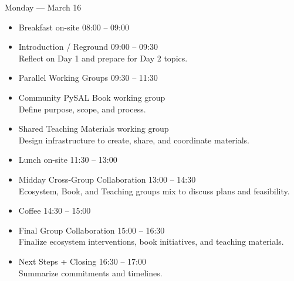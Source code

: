 \documentclass[11pt, aspectratio=169]{beamer}
\begin{document}
\begin{frame}{Monday — March 16}
  \large
  \begin{itemize}
    \item Breakfast on-site \hfill 08:00 -- 09:00
    \item Introduction / Reground \hfill 09:00 -- 09:30\\
      \quad Reflect on Day 1 and prepare for Day 2 topics.
    \item Parallel Working Groups \hfill 09:30 -- 11:30
    \item Community PySAL Book working group \\
      \quad Define purpose, scope, and process.
    \item Shared Teaching Materials working group \\
      \quad Design infrastructure to create, share, and coordinate materials.
    \item Lunch on-site \hfill 11:30 -- 13:00
    \item Midday Cross-Group Collaboration \hfill 13:00 -- 14:30\\
      \quad Ecosystem, Book, and Teaching groups mix to discuss plans and feasibility.
    \item Coffee \hfill 14:30 -- 15:00
    \item Final Group Collaboration \hfill 15:00 -- 16:30\\
      \quad Finalize ecosystem interventions, book initiatives, and teaching materials.
    \item Next Steps + Closing \hfill 16:30 -- 17:00\\
      \quad Summarize commitments and timelines.
  \end{itemize}

\end{frame}
\end{document}
